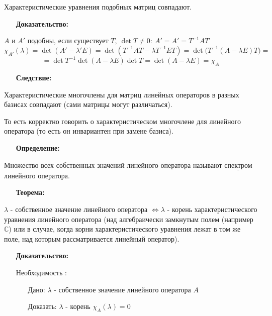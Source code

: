 \documentclass[12pt, letterpaper, twoside]{article}
\newcommand{\Underl}[1]{$\underline{\text{#1}}$}
\begin{document}
        Характеристические уравнения подобных матриц совпадают.
        \begin{enumerate}
            \item[\textbf{Доказательство:}]
        \end{enumerate}
        $A$ и $A'$ подобны, если существует $T,\ \det T \neq 0:\ A' = A' = T^{-1}AT$
        \[\chi_{A'}(\lambda) = \det(A' - \lambda' E)=\det(T^{-1}AT - \lambda T^{-1}ET)=\det\big(T^{-1}(A-\lambda E)T\big)=\]
        \[=\det T^{-1}\det(A - \lambda E)\det T = \det(A - \lambda E) = \chi_A\]
        \newpage
        \begin{enumerate}
            \item[\textbf{Следствие:}]
        \end{enumerate}
        Характеристические многочлены для матриц линейных операторов в разных базисах совпадают (сами матрицы могут различаться).\par
        То есть корректно говорить о характеристическом многочлене для линейного оператора (то есть он инвариантен при замене базиса).
        \begin{enumerate}
            \item[\textbf{Определение:}]
        \end{enumerate}
        Множество всех собственных значений линейного оператора называют \Underl{спектром} линейного оператора.
        \begin{enumerate}
            \item[\textbf{Теорема:}]
        \end{enumerate}
        $\lambda$ - собственное значение линейного оператора $\Leftrightarrow \lambda$ - корень характеристического уравнения линейного оператора (над алгебраически замкнутым полем (например $\mathbb{C}$) или в случае, когда корни характеристического уравнения лежат в том же поле, над которым рассматривается линейный оператор).
        \begin{enumerate}
            \item[\textbf{Доказательство:}]
        \end{enumerate}
        \begin{enumerate}
            \item[Необходимость]:
            \begin{enumerate}
                \item[Дано:] $\lambda$ - собственное значение линейного оператора $A$
                \item[Доказать:] $\lambda$ - корень $\chi_A(\lambda) = 0$ 
            \end{enumerate}
        \end{enumerate}
\end{document}
